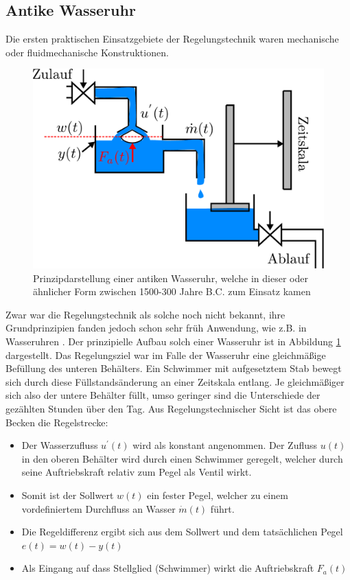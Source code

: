 \subsection{Antike Wasseruhr}
%
Die ersten praktischen Einsatzgebiete der Regelungstechnik waren mechanische oder fluidmechanische Konstruktionen. 
%
\begin{figure}[h]
	\centering
	\includegraphics[width=0.6\linewidth]{Abbildungen/Grundbegriffe/PDF/HistorischeSystemeWasseruhr.pdf}
	\caption{Prinzipdarstellung einer antiken Wasseruhr, welche in dieser oder ähnlicher Form zwischen 1500-300 Jahre B.C. zum Einsatz kamen}
	\label{fig:wasseruhr}
\end{figure}
%
Zwar war die Regelungstechnik als solche noch nicht bekannt, ihre Grundprinzipien fanden jedoch schon sehr früh Anwendung, wie z.B. in Wasseruhren \cite{Lewis00,Landes00}. Der prinzipielle Aufbau solch einer Wasseruhr ist in Abbildung \ref{fig:wasseruhr} dargestellt. 
%
Das Regelungsziel war im Falle der Wasseruhr eine gleichmäßige Befüllung des unteren Behälters. Ein Schwimmer mit aufgesetztem Stab bewegt sich durch diese Füllstandsänderung an einer Zeitskala entlang. Je gleichmäßiger sich also der untere Behälter füllt, umso geringer sind die Unterschiede der gezählten Stunden über den Tag. Aus Regelungstechnischer Sicht ist das obere Becken die Regelstrecke:
%
\begin{itemize}
%
	\item Der Wasserzufluss $u^{'}(t)$ wird als konstant angenommen. Der Zufluss $u(t)$ in den oberen Behälter wird durch einen Schwimmer geregelt, welcher durch seine Auftriebskraft relativ zum Pegel als Ventil wirkt.
	\item Somit ist der Sollwert $w(t)$ ein fester Pegel, welcher zu einem vordefiniertem Durchfluss an Wasser $\dot{m}(t)$ führt.
	\item Die Regeldifferenz ergibt sich aus dem Sollwert und dem tatsächlichen Pegel $e(t)=w(t)-y(t)$
	\item Als Eingang auf dass Stellglied (Schwimmer) wirkt die Auftriebskraft $F_{a}(t)$
\end{itemize}
%
